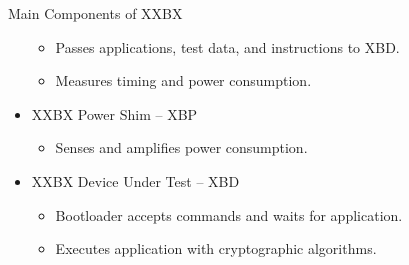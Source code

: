 \documentclass[xcolor=pdftex,dvipsnames,table,final]{beamer}
\begin{document}
\begin{frame}[fragile]{}
\begin{columns}[t, totalwidth=\textwidth]
\begin{column}{.675\linewidth}
\begin{columns}
\begin{column}{.473\linewidth}
\begin{block}{Main Components of XXBX}
\begin{itemize}
\begin{itemize}
            \item Passes applications, test data, and instructions to XBD.
            \item Measures timing and power consumption.
          \end{itemize}
          \item XXBX Power Shim -- XBP
          \begin{itemize}
            \item Senses and amplifies power consumption.
          \end{itemize}
          \item XXBX Device Under Test -- XBD
          \begin{itemize}
            \item Bootloader accepts commands and waits for application.
            \item Executes application with cryptographic algorithms.
          \end{itemize}
        \end{itemize}
      \end{block}
     

\end{column}
\end{columns}
\end{column}
\end{columns}
\end{frame}
\end{document}
